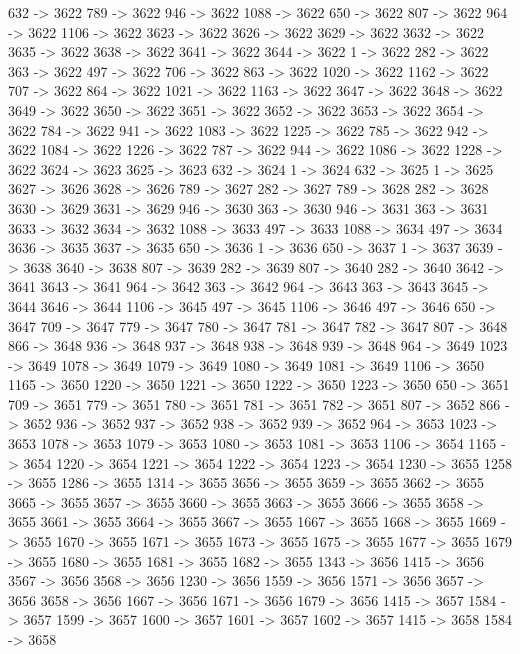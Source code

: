 {	632 -> 3622
	789 -> 3622
	946 -> 3622
	1088 -> 3622
	650 -> 3622
	807 -> 3622
	964 -> 3622
	1106 -> 3622
	3623 -> 3622
	3626 -> 3622
	3629 -> 3622
	3632 -> 3622
	3635 -> 3622
	3638 -> 3622
	3641 -> 3622
	3644 -> 3622
	1 -> 3622
	282 -> 3622
	363 -> 3622
	497 -> 3622
	706 -> 3622
	863 -> 3622
	1020 -> 3622
	1162 -> 3622
	707 -> 3622
	864 -> 3622
	1021 -> 3622
	1163 -> 3622
	3647 -> 3622
	3648 -> 3622
	3649 -> 3622
	3650 -> 3622
	3651 -> 3622
	3652 -> 3622
	3653 -> 3622
	3654 -> 3622
	784 -> 3622
	941 -> 3622
	1083 -> 3622
	1225 -> 3622
	785 -> 3622
	942 -> 3622
	1084 -> 3622
	1226 -> 3622
	787 -> 3622
	944 -> 3622
	1086 -> 3622
	1228 -> 3622
	3624 -> 3623
	3625 -> 3623
	632 -> 3624
	1 -> 3624
	632 -> 3625
	1 -> 3625
	3627 -> 3626
	3628 -> 3626
	789 -> 3627
	282 -> 3627
	789 -> 3628
	282 -> 3628
	3630 -> 3629
	3631 -> 3629
	946 -> 3630
	363 -> 3630
	946 -> 3631
	363 -> 3631
	3633 -> 3632
	3634 -> 3632
	1088 -> 3633
	497 -> 3633
	1088 -> 3634
	497 -> 3634
	3636 -> 3635
	3637 -> 3635
	650 -> 3636
	1 -> 3636
	650 -> 3637
	1 -> 3637
	3639 -> 3638
	3640 -> 3638
	807 -> 3639
	282 -> 3639
	807 -> 3640
	282 -> 3640
	3642 -> 3641
	3643 -> 3641
	964 -> 3642
	363 -> 3642
	964 -> 3643
	363 -> 3643
	3645 -> 3644
	3646 -> 3644
	1106 -> 3645
	497 -> 3645
	1106 -> 3646
	497 -> 3646
	650 -> 3647
	709 -> 3647
	779 -> 3647
	780 -> 3647
	781 -> 3647
	782 -> 3647
	807 -> 3648
	866 -> 3648
	936 -> 3648
	937 -> 3648
	938 -> 3648
	939 -> 3648
	964 -> 3649
	1023 -> 3649
	1078 -> 3649
	1079 -> 3649
	1080 -> 3649
	1081 -> 3649
	1106 -> 3650
	1165 -> 3650
	1220 -> 3650
	1221 -> 3650
	1222 -> 3650
	1223 -> 3650
	650 -> 3651
	709 -> 3651
	779 -> 3651
	780 -> 3651
	781 -> 3651
	782 -> 3651
	807 -> 3652
	866 -> 3652
	936 -> 3652
	937 -> 3652
	938 -> 3652
	939 -> 3652
	964 -> 3653
	1023 -> 3653
	1078 -> 3653
	1079 -> 3653
	1080 -> 3653
	1081 -> 3653
	1106 -> 3654
	1165 -> 3654
	1220 -> 3654
	1221 -> 3654
	1222 -> 3654
	1223 -> 3654
	1230 -> 3655
	1258 -> 3655
	1286 -> 3655
	1314 -> 3655
	3656 -> 3655
	3659 -> 3655
	3662 -> 3655
	3665 -> 3655
	3657 -> 3655
	3660 -> 3655
	3663 -> 3655
	3666 -> 3655
	3658 -> 3655
	3661 -> 3655
	3664 -> 3655
	3667 -> 3655
	1667 -> 3655
	1668 -> 3655
	1669 -> 3655
	1670 -> 3655
	1671 -> 3655
	1673 -> 3655
	1675 -> 3655
	1677 -> 3655
	1679 -> 3655
	1680 -> 3655
	1681 -> 3655
	1682 -> 3655
	1343 -> 3656
	1415 -> 3656
	3567 -> 3656
	3568 -> 3656
	1230 -> 3656
	1559 -> 3656
	1571 -> 3656
	3657 -> 3656
	3658 -> 3656
	1667 -> 3656
	1671 -> 3656
	1679 -> 3656
	1415 -> 3657
	1584 -> 3657
	1599 -> 3657
	1600 -> 3657
	1601 -> 3657
	1602 -> 3657
	1415 -> 3658
	1584 -> 3658
}
